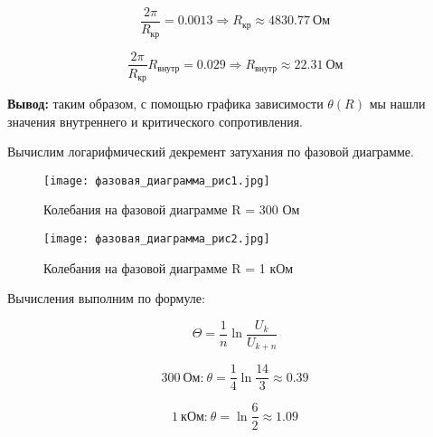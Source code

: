 	\begin{equation*}
		\frac{2 \pi}{R_{\text{кр}}} = 0.0013 \Rightarrow R_{\text{кр}} \approx 4830.77 ~ \text{Ом}
	\end{equation*}
	
	\begin{equation*}
		\frac{2 \pi}{R_{\text{кр}}} R_{\text{внутр}} = 0.029 \Rightarrow R_{\text{внутр}} \approx 22.31 ~ \text{Ом}
	\end{equation*}
	
	\noindent \textbf{Вывод:} таким образом, с помощью графика зависимости $\theta(R)$ мы нашли значения внутреннего и критического сопротивления.
	
	\noindent Вычислим логарифмический декремент затухания по фазовой диаграмме.\\
	
	\begin{figure} [h!]
		\centering
		\texttt{[image: фазовая\_диаграмма\_рис1.jpg]}
		\caption{Колебания на фазовой диаграмме R = 300 Ом}
	\end{figure}
	
	\begin{figure} [h!]
		\centering
		\texttt{[image: фазовая\_диаграмма\_рис2.jpg]}
		\caption{Колебания на фазовой диаграмме R = 1 кОм}
	\end{figure}


	\noindent Вычисления выполним по формуле:
	
	\begin{equation}
		\Theta = \frac{1}{n} \ln \frac{U_k}{U_{k + n}}
	\end{equation}
	
	\[ 300 ~ \text{Ом:} ~ \theta = \frac{1}{4} \ln \frac{14}{3} \approx 0.39 \]
	
	\[ 1 ~ \text{кОм:} ~ \theta = \ln \frac{6}{2} \approx 1.09 \]
	





